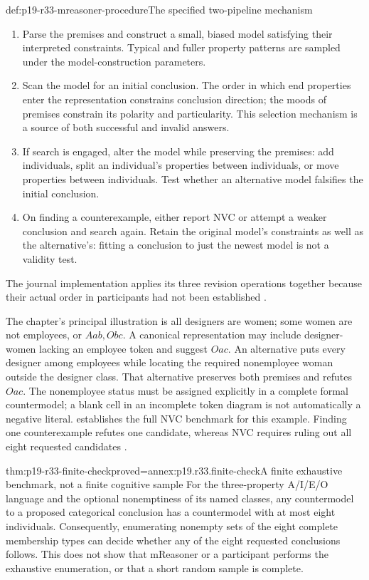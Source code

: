 \begin{hbmethod}{def:p19-r33-mreasoner-procedure}{The specified two-pipeline mechanism}
\begin{enumerate}
\item Parse the premises and construct a small, biased model satisfying
their interpreted constraints. Typical and fuller property patterns are
sampled under the model-construction parameters.
\item Scan the model for an initial conclusion. The order in which end
properties enter the representation constrains conclusion direction;
the moods of premises constrain its polarity and particularity.
This selection mechanism is a source of both successful and invalid answers.
\item If search is engaged, alter the model while preserving the premises:
add individuals, split an individual's properties between individuals,
or move properties between individuals. Test whether an alternative
model falsifies the initial conclusion.
\item On finding a counterexample, either report NVC or attempt a weaker
conclusion and search again. Retain the original model's constraints
as well as the alternative's: fitting a conclusion to just the newest
model is not a validity test.
\end{enumerate}
The journal implementation applies its three revision operations together
because their actual order in participants had not been established
\cite[pp.~297--298]{KhemlaniJohnsonLaird2021OnlineProperties}.
\end{hbmethod}

The chapter's principal illustration is all designers are women; some women
are not employees, or \(Aab,Obc\). A canonical representation may
include designer-women lacking an employee token and suggest \(Oac\).
An alternative puts every designer among employees while locating the
required nonemployee woman outside the designer class. That alternative
preserves both premises and refutes \(Oac\). The nonemployee status
must be assigned explicitly in a complete formal countermodel; a blank
cell in an incomplete token diagram is not automatically a negative literal.
 establishes the full NVC benchmark for this
example. Finding one counterexample refutes one candidate, whereas NVC
requires ruling out all eight requested candidates
\cite[p.~232]{Khemlani2021Syllogistic}.

\begin{hbtheorem}{thm:p19-r33-finite-check}{proved=annex:p19.r33.finite-check}{A finite exhaustive benchmark, not a finite cognitive sample}
For the three-property A/I/E/O language and the optional nonemptiness of
its named classes, any countermodel to a proposed categorical conclusion
has a countermodel with at most eight individuals. Consequently,
enumerating nonempty sets of the eight complete membership types can
decide whether any of the eight requested conclusions follows.
This does not show that mReasoner or a participant performs the exhaustive
enumeration, or that a short random sample is complete.
\end{hbtheorem}

